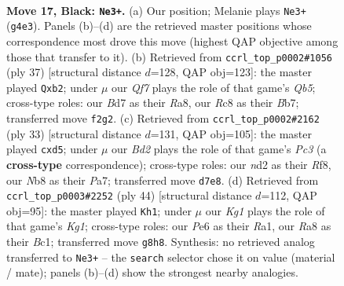 \documentclass[11pt]{article}
\begin{document}
\clearpage

\begin{figure}[p]\centering
\begin{subfigure}{0.46\textwidth}\centering
\resizebox{\linewidth}{!}{%
\newchessgame
\chessboard[
  setfen={rnr3k1/pQ1b1ppp/4p3/8/2B1P1nP/5N2/PP1N1qP1/R2K3R b - - 0 17},
  showmover=false,
  pgfstyle=straightmove, color=movearrow, markmove={g4-e3}
]}
\caption{}
\end{subfigure}\hfill
\begin{subfigure}{0.46\textwidth}\centering
\resizebox{\linewidth}{!}{%
\newchessgame
\chessboard[
  setfen={r2r2k1/1bQp1ppp/2n1p3/1Bp5/Pq2P3/2N4P/1P3PP1/R2R2K1 b - - 4 19},
  showmover=false,
  pgfstyle=straightmove, color=movearrow, markmove={b4-b2}
]}
\caption{}
\end{subfigure}
\\[4pt]
\begin{subfigure}{0.46\textwidth}\centering
\resizebox{\linewidth}{!}{%
\newchessgame
\chessboard[
  setfen={r4rk1/pQ3pbp/n1p3p1/3P4/8/5N2/PP2qPPP/R1B2RK1 b - - 0 17},
  showmover=false,
  pgfstyle=straightmove, color=movearrow, markmove={c6-d5}
]}
\caption{}
\end{subfigure}\hfill
\begin{subfigure}{0.46\textwidth}\centering
\resizebox{\linewidth}{!}{%
\newchessgame
\chessboard[
  setfen={k3r3/5Q1p/p2r1n2/2b1p3/P3P3/1p6/1PqN1PPP/R1B1R1K1 w - - 1 23},
  showmover=false,
  pgfstyle=straightmove, color=movearrow, markmove={g1-h1}
]}
\caption{}
\end{subfigure}
\caption{\textbf{Move 17, Black: \texttt{Ne3+}.} (a) Our position; Melanie plays \texttt{Ne3+} (\texttt{g4e3}). Panels (b)--(d) are the retrieved master positions whose correspondence most drove this move (highest QAP objective among those that transfer to it). (b) Retrieved from \texttt{ccrl\_top\_p0002\#1056} (ply 37) [structural distance $d$=128, QAP obj=123]: the master played \texttt{Qxb2}; under $\mu$ our \emph{Qf7} plays the role of that game's \emph{Qb5}; cross-type roles: our \emph{B}d7 as their \emph{R}a8, our \emph{R}c8 as their \emph{B}b7; transferred move \texttt{f2g2}. (c) Retrieved from \texttt{ccrl\_top\_p0002\#2162} (ply 33) [structural distance $d$=131, QAP obj=105]: the master played \texttt{cxd5}; under $\mu$ our \emph{Bd2} plays the role of that game's \emph{Pc3} (a \textbf{cross-type} correspondence); cross-type roles: our \emph{n}d2 as their \emph{R}f8, our \emph{N}b8 as their \emph{P}a7; transferred move \texttt{d7e8}. (d) Retrieved from \texttt{ccrl\_top\_p0003\#2252} (ply 44) [structural distance $d$=112, QAP obj=95]: the master played \texttt{Kh1}; under $\mu$ our \emph{Kg1} plays the role of that game's \emph{Kg1}; cross-type roles: our \emph{P}e6 as their \emph{R}a1, our \emph{R}a8 as their \emph{B}c1; transferred move \texttt{g8h8}. Synthesis: no retrieved analog transferred to \texttt{Ne3+} -- the \texttt{search} selector chose it on value (material / mate); panels (b)--(d) show the strongest nearby analogies.}
\label{fig:thought-m33}
\end{figure}
\end{document}
